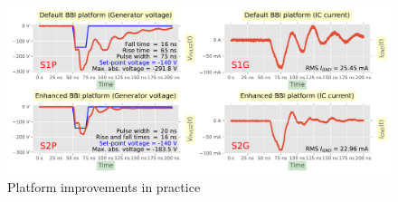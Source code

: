 
\begin{figure}[h]
	\centering
	\includegraphics[width=\columnwidth]{./figures/realPulsesComparisons.pdf}
	\caption{Platform improvements in practice}
	\label{actual_imp}
\end{figure}
